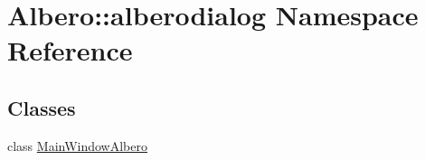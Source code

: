 \hypertarget{namespaceAlbero_1_1alberodialog}{
\section{Albero::alberodialog Namespace Reference}
\label{namespaceAlbero_1_1alberodialog}
}
\subsection*{Classes}
\begin{DoxyCompactItemize}
\item 
class \hyperlink{classAlbero_1_1alberodialog_1_1MainWindowAlbero}{MainWindowAlbero}
\end{DoxyCompactItemize}
